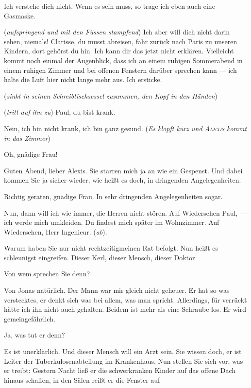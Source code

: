\documentclass[
	final,
	a4paper,
	ngerman,
	mpinclude = true, %
	twoside = true,
	open = right,
	cleardoublepage = plain,
	DIV = 13,
	BCOR = 1cm,
	titlepage = firstiscover,
	]{scrbook}
\newcommand{\direction}[1]{(\textit{#1})}
\newcommand{\thecharacter}[1]{\textup{\textsc{#1}}\xspace}
\newcommand{\theClarisse}{\thecharacter{Clarisse}}
\newcommand{\theAlexis}{\thecharacter{Alexis}}
\newcommand{\character}[1]{\item[#1]}
\newcommand{\Generaldirektor}{\character{Direktor}}
\newcommand{\Clarisse}{\character{\theClarisse}}
\newcommand{\Alexis}{\character{\theAlexis}}
\begin{document}
\begin{play}
\Clarisse
Ich verstehe dich nicht. Wenn es sein muss, so trage ich eben auch eine Gasmaske.

\Generaldirektor
\direction{aufspringend und mit den Füssen stampfend} Ich aber will dich nicht darin sehen, niemals! Clarisse, du musst abreisen, fahr zurück nach Paris zu unseren Kindern, dort gehörst du hin. Ich kann dir das jetzt nicht erklären. Vielleicht kommt noch einmal der Augenblick, dass ich an einem ruhigen Sommerabend in einem ruhigen Zimmer und bei offenen Fenstern darüber sprechen kann --- ich halte die Luft hier nicht lange mehr aus. Ich ersticke.

\direction{sinkt in seinen Schreibtischsessel zusammen, den Kopf in den Händen}

\Clarisse
\direction{tritt auf ihn zu} Paul, du bist krank.

\Generaldirektor
Nein, ich bin nicht krank, ich bin ganz gesund. \direction{Es klopft kurz und \theAlexis kommt in das Zimmer}

\Alexis
Oh, gnädige Frau!

\Clarisse
Guten Abend, lieber Alexis. Sie starren mich ja an wie ein Gespenst. Und dabei kommen Sie ja sicher wieder, wie heißt es doch, in dringenden Angelegenheiten.

\Alexis
Richtig geraten, gnädige Frau. In sehr dringenden Angelegenheiten sogar.

\Clarisse
Nun, dann will ich wie immer, die Herren nicht stören. Auf Wiedersehen Paul, --- ich werde mich umkleiden. Du findest mich später im Wohnzimmer. Auf Wiedersehen, Herr Ingenieur. \direction{ab}.

\Alexis
Warum haben Sie nur nicht rechtzeitigmeinen Rat befolgt. Nun heißt es schleunigst eingreifen. Dieser Kerl, dieser Mensch, dieser Doktor

\Generaldirektor
Von wem sprechen Sie denn?

\Alexis
Von Jonas natürlich. Der Mann war mir gleich nicht geheuer. Er hat so was verstecktes, er denkt sich was bei allem, was man spricht. Allerdings, für verrückt hätte ich ihn nicht auch gehalten. Beidem ist mehr als eine Schraube los. Er wird gemeingefährlich.

\Generaldirektor
Ja, was tut er denn?

\Alexis
Es ist unerklärlich. Und dieser Mensch will ein Arzt sein. Sie wissen doch, er ist Leiter der Tuberkulosenabteilung im Krankenhaus. Nun stellen Sie sich vor, was er treibt: Gestern Nacht ließ er die schwerkranken Kinder auf das offene Dach hinaus schaffen, in den Sälen reißt er die Fenster auf


\end{play}
\end{document}
